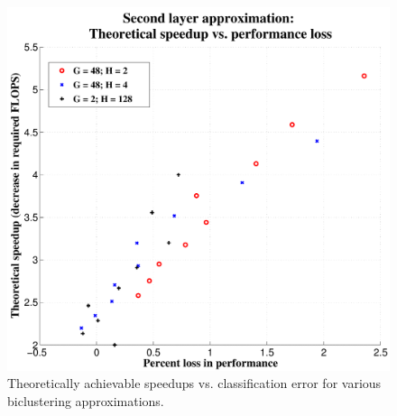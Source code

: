 \documentclass{article} %
\begin{document}
\begin{figure}[t]
\centering
\begin{minipage}{0.75\textwidth}
  \includegraphics[width=\linewidth]{img/layer2_theoreticalspeedup_vs_performance_loss.pdf} 
\end{minipage}
\caption{Theoretically achievable speedups vs. classification error for various biclustering approximations.}
\label{fig:biclustering_theory}
\end{figure}
\end{document}
